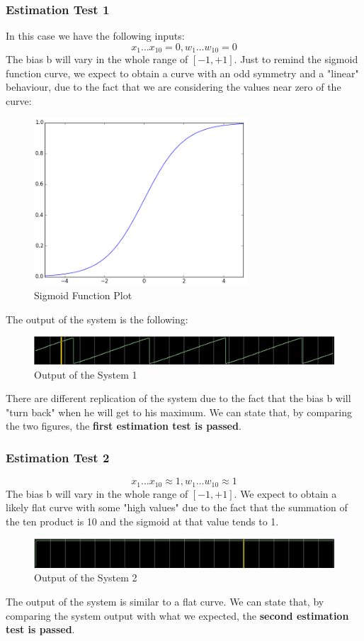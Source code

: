 \subsubsection{Estimation Test 1}
In this case we have the following inputs:
\begin{equation}
	x_{1} \dots x_{10} = 0, w_{1} \dots w_{10} = 0
\end{equation}
The bias b will vary in the whole range of $[-1, +1]$. Just to remind the sigmoid function curve, we expect to obtain a curve with an odd symmetry and a "linear" behaviour, due to the fact that we are considering the values near zero of the curve:
\begin{figure}[H]
	\centering
	\caption{Sigmoid Function Plot}
	\includegraphics[width=8cm]{img/sigmoid.png}
\end{figure}
The output of the system is the following:
\begin{figure}[H]
	\centering
	\caption{Output of the System 1}
	\includegraphics[width=\textwidth]{img/est_test_1.png}
\end{figure}
There are different replication of the system due to the fact that the bias b will "turn back" when he will get to his maximum. We can state that, by comparing the two figures, the \textbf{first estimation test is passed}. 
\subsubsection{Estimation Test 2}
\begin{equation}
	x_{1} \dots x_{10} \approx 1, w_{1} \dots w_{10} \approx 1
\end{equation}
The bias b will vary in the whole range of $[-1, +1]$. We expect to obtain a likely flat curve with some "high values" due to the fact that the summation of the ten product is 10 and the sigmoid at that value tends to 1.
\begin{figure}[H]
	\centering
	\caption{Output of the System 2}
	\includegraphics[width=\textwidth]{img/est_test_2.png}
\end{figure}
The output of the system is similar to a flat curve. We can state that, by comparing the system output with what we expected, the \textbf{second estimation test is passed}.
